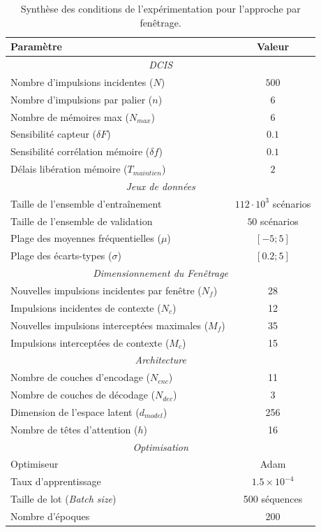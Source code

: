 \begin{table}[htbp]
\centering
\begin{tabular}{lc}
\toprule
\textbf{Paramètre} & \textbf{Valeur} \\
\midrule
\multicolumn{2}{c}{\textit{DCIS}} \\
\midrule
Nombre d'impulsions incidentes ($N$) & $500$ \\
Nombre d'impulsions par palier ($n$) & $6$ \\
Nombre de mémoires max ($N_{max}$) & $6$ \\
Sensibilité capteur ($\delta F$) & $0.1$\\
Sensibilité corrélation mémoire ($\delta f$) & $0.1$\\
Délais libération mémoire ($T_{maintien}$) & $2$\\
\midrule
\multicolumn{2}{c}{\textit{Jeux de données}} \\
\midrule
Taille de l'ensemble d'entraînement & $112 \cdot 10^3$ scénarios \\
Taille de l'ensemble de validation & $50$ scénarios \\
Plage des moyennes fréquentielles ($\mu$) & $[-5 ; 5]$ \\
Plage des écarts-types ($\sigma$) & $[0.2 ; 5]$ \\
\midrule
\multicolumn{2}{c}{\textit{Dimensionnement du Fenêtrage}} \\
\midrule
Nouvelles impulsions incidentes par fenêtre ($N_f$) & 28 \\
Impulsions incidentes de contexte ($N_c$) & 12 \\
Nouvelles impulsions interceptées maximales ($M_f$) & 35 \\
Impulsions interceptées de contexte ($M_c$) & 15 \\
\midrule
\multicolumn{2}{c}{\textit{Architecture}} \\
\midrule
Nombre de couches d'encodage ($N_{enc}$) & 11 \\
Nombre de couches de décodage ($N_{dec}$) & 3 \\
Dimension de l'espace latent ($d_{model}$) & 256 \\
Nombre de têtes d'attention ($h$) & 16 \\
\midrule
\multicolumn{2}{c}{\textit{Optimisation}} \\
\midrule
Optimiseur & Adam \\
Taux d'apprentissage & $1.5 \times 10^{-4}$ \\
Taille de lot (\textit{Batch size}) & 500 séquences \\
Nombre d'époques & 200 \\
\bottomrule
\end{tabular}
\caption{Synthèse des conditions de l'expérimentation pour l'approche par fenêtrage.}
\label{tab:params_win}
\end{table}

